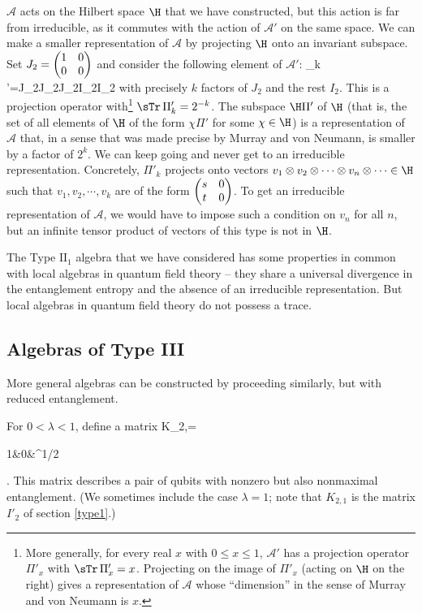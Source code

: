 \documentclass[12pt]{article}
\def\II{{\mathrm {II}}}
\def\bp{\begin{pmatrix}}
\def\ep{\end{pmatrix}}
\numberwithin{equation}{section}
\def\A{{\mathcal A}}
\begin{document}
$\A$ acts on the Hilbert space $\H$ that we have constructed, but  this
action is far from irreducible, as it commutes with the action of $\A'$ on the same space.
We can make a smaller representation of $\A$ by projecting 
$\H$ onto an invariant subspace.  Set $J_2=\bp 1&0\cr 0&0\ep$
and consider the following element of $\A'$:
\be\label{mork} \Pi_k '=J_2\otimes J_2\otimes \cdots \otimes J_2\otimes I_2\otimes I_2\otimes \cdots \ee
with precisely $k$ factors of $J_2$ and the rest $I_2$.  This 
is a projection operator with\footnote{More generally, for every real $x$ with $0\leq x\leq 1$, $\A'$ has
a projection operator $\Pi'_x$ with $\sTr\,\Pi'_x=x$.  Projecting on the image 
of $\Pi'_x$ (acting on $\H$ on the right) gives a representation of $\A$ whose
``dimension'' in the sense of Murray and von Neumann is $x$.} $\sTr\,\Pi_k' =2^{-k}$.  The subspace $\H \Pi'$ of $\H$
(that is, the set of all elements of $\H$ of the form $\chi \Pi'$ for some $\chi\in\H$)
is a representation of $\A$ that, in a sense that was made precise by 
Murray and von Neumann, is smaller by a factor of $2^k$.
We can keep going and never get to an irreducible representation.  Concretely, $\Pi'_k$ projects onto vectors
$v_1\otimes v_2\otimes \cdots \otimes v_n\otimes \cdots 
 \in \H$ such that $v_1,v_2,\cdots, v_k$ are of the form $\bp s & 0\cr t & 0\ep$.  To get an 
irreducible representation of $\A$, we would have to impose such a condition on  $v_n$ for all $n$, 
but an infinite tensor product of vectors of this type is
not in $\H$.  


The Type $\II_1$ algebra that we have considered has some properties in common with local algebras 
in quantum field theory -- they share a
 universal divergence in the entanglement entropy and the absence of an irreducible
representation.  But local algebras in quantum field theory do not possess a trace.  


\subsection{Algebras of Type III}\label{type3}


More general algebras can be constructed by proceeding similarly, but with reduced entanglement.

For $0<\lambda<1$, define a matrix 
\be\label{morno} K_{2,\lambda}=\bp 1&0&\lambda^{1/2} \ep.\ee
This matrix describes a pair of qubits with nonzero but also nonmaximal entanglement.  (We sometimes include the 
case $\lambda=1$; note  that $K_{2,1}$ is the matrix $I'_2$ of section \ref{type1}.)
\end{document}
